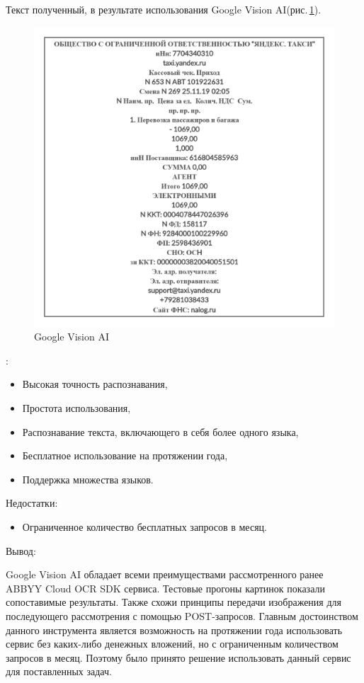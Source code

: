 \documentclass[14pt]{mmcs_article}
\begin{document}
Текст полученный, в результате использования Google Vision AI(рис.\,\ref{stud:fig:4}).
\begin{figure}[H]
  \centering
  \includegraphics[scale=0.35]{test2.png}
  \caption{Google Vision AI}\label{stud:fig:4}
\end{figure}
:
\begin{itemize}
\item Высокая точность распознавания,
\item Простота использования,
\item Распознавание текста, включающего в себя более одного языка,
\item Бесплатное использование на протяжении года,
\item Поддержка множества языков.
\end{itemize}
Недостатки:
\begin{itemize}
\item Ограниченное количество бесплатных запросов в месяц.
\end{itemize}
Вывод:

Google Vision AI обладает всеми преимуществами рассмотренного ранее ABBYY Cloud OCR SDK сервиса. Тестовые прогоны картинок показали сопоставимые результаты. Также схожи принципы передачи изображения для последующего рассмотрения с помощью POST-запросов. Главным достоинством данного инструмента является возможность на протяжении года использовать сервис без каких-либо денежных вложений, но с ограниченным количеством запросов в месяц. Поэтому было принято решение использовать данный сервис для поставленных задач.
\end{document}
